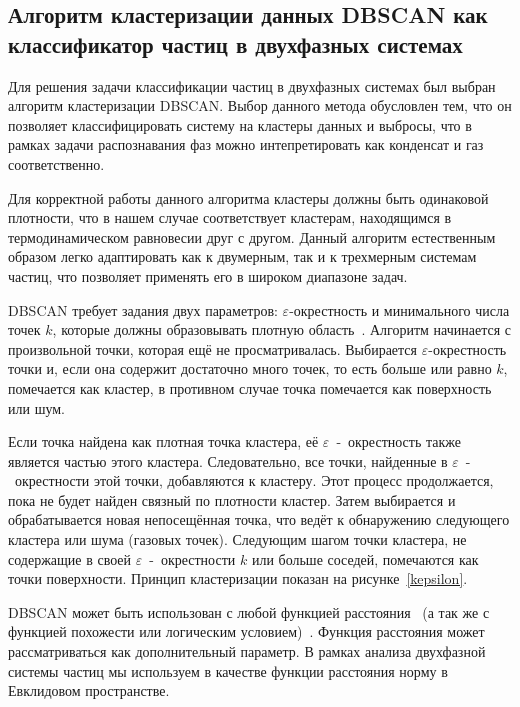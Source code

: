 \subsection{Алгоритм кластеризации данных DBSCAN как классификатор частиц в двухфазных системах}
\label{PRIMe-SubSecDBSCAN}

Для решения задачи классификации частиц в двухфазных системах был выбран алгоритм кластеризации DBSCAN.
Выбор данного метода обусловлен тем, что он позволяет классифицировать систему на кластеры данных и выбросы, что в рамках задачи распознавания фаз можно интепретировать как конденсат и газ соответственно.

Для корректной работы данного алгоритма кластеры должны быть одинаковой плотности, что в нашем случае соответствует кластерам, находящимся в термодинамическом равновесии друг с другом.
Данный алгоритм естественным образом легко адаптировать как к двумерным, так и к трехмерным системам частиц, что позволяет применять его в широком диапазоне задач.

DBSCAN требует задания двух параметров: $\varepsilon$-окрестность и минимального числа точек $k$, которые должны образовывать плотную область~\cite{schubert2017dbscan}.
Алгоритм начинается с произвольной точки, которая ещё не просматривалась.
Выбирается $\varepsilon$-окрестность точки и, если она содержит достаточно много точек, то есть больше или равно $k$, помечается как кластер, в противном случае точка помечается как поверхность или шум.

Если точка найдена как плотная точка кластера, её $\varepsilon$~-~окрестность также является частью этого кластера.
Следовательно, все точки, найденные в $\varepsilon$~-~окрестности этой точки, добавляются к кластеру.
Этот процесс продолжается, пока не будет найден связный по плотности кластер.
Затем выбирается и обрабатывается новая непосещённая точка, что ведёт к обнаружению следующего кластера или шума (газовых точек).
Следующим шагом точки кластера, не содержащие в своей $\varepsilon$~-~окрестности $k$ или больше соседей, помечаются как точки поверхности.
Принцип кластеризации показан на рисунке~\ref{kepsilon}.

DBSCAN может быть использован с любой функцией расстояния~\cite{schubert2017dbscan} (а так же с функцией похожести или логическим условием)~\cite{10.1023/a:1009745219419}.
Функция расстояния может рассматриваться как дополнительный параметр.
В рамках анализа двухфазной системы частиц мы используем в качестве функции расстояния норму в Евклидовом пространстве.

